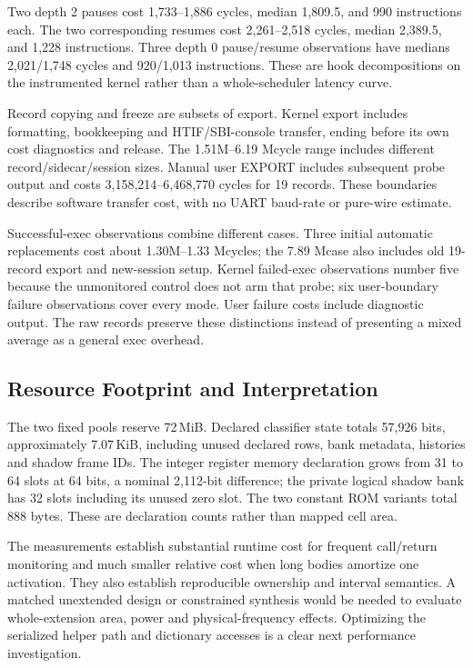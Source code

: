 Two depth 2 pauses cost 1,733--1,886 cycles, median 1,809.5, and 990 instructions each. The two corresponding resumes cost 2,261--2,518 cycles, median 2,389.5, and 1,228 instructions. Three depth 0 pause/resume observations have medians 2,021/1,748 cycles and 920/1,013 instructions. These are hook decompositions on the instrumented kernel rather than a whole-scheduler latency curve.

Record copying and freeze are subsets of export. Kernel export includes formatting, bookkeeping and HTIF/SBI-console transfer, ending before its own cost diagnostics and release. The 1.51M--6.19 Mcycle range includes different record/sidecar/session sizes. Manual user EXPORT includes subsequent probe output and costs 3,158,214--6,468,770 cycles for 19 records. These boundaries describe software transfer cost, with no UART baud-rate or pure-wire estimate.

Successful-exec observations combine different cases. Three initial automatic replacements cost about 1.30M--1.33 Mcycles; the 7.89 Mcase also includes old 19-record export and new-session setup. Kernel failed-exec observations number five because the unmonitored control does not arm that probe; six user-boundary failure observations cover every mode. User failure costs include diagnostic output. The raw records preserve these distinctions instead of presenting a mixed average as a general exec overhead.

\subsection{Resource Footprint and Interpretation}
The two fixed pools reserve 72\,MiB. Declared classifier state totals 57,926 bits, approximately 7.07\,KiB, including unused declared rows, bank metadata, histories and shadow frame IDs. The integer register memory declaration grows from 31 to 64 slots at 64 bits, a nominal 2,112-bit difference; the private logical shadow bank has 32 slots including its unused zero slot. The two constant ROM variants total 888 bytes. These are declaration counts rather than mapped cell area.

The measurements establish substantial runtime cost for frequent call/return monitoring and much smaller relative cost when long bodies amortize one activation. They also establish reproducible ownership and interval semantics. A matched unextended design or constrained synthesis would be needed to evaluate whole-extension area, power and physical-frequency effects. Optimizing the serialized helper path and dictionary accesses is a clear next performance investigation.
